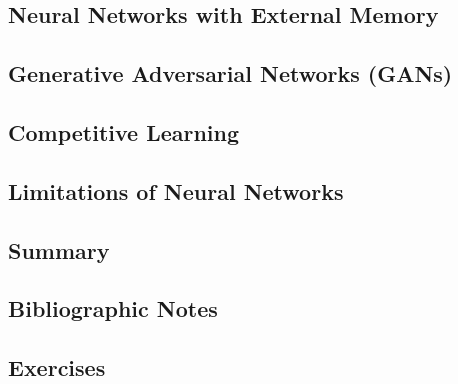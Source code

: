 \documentclass[a4paper]{article}
\begin{document}
\subsection{Neural Networks with External Memory}

\subsection{Generative Adversarial Networks (GANs)}

\subsection{Competitive Learning}

\subsection{Limitations of Neural Networks}

\subsection{Summary}

\subsection{Bibliographic Notes}

\subsection{Exercises}





\end{document}
